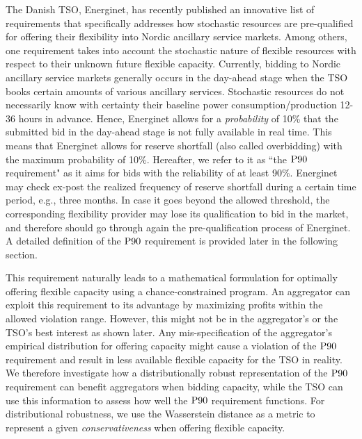 \documentclass[conference]{IEEEtran}
\begin{document}
The Danish \ac{TSO}, Energinet, has recently published an innovative list of requirements \cite{energinet} that specifically addresses how stochastic  resources are pre-qualified for offering their flexibility into Nordic ancillary service markets. Among others, one requirement takes into account the stochastic nature of  flexible resources with respect to their unknown future flexible capacity. Currently, bidding to Nordic ancillary service markets generally occurs in the day-ahead stage when the \ac{TSO} books certain amounts of various ancillary services. Stochastic resources do not necessarily know with certainty their baseline power consumption/production 12-36 hours in advance. Hence, Energinet allows for a \textit{probability} of 10\% that the submitted bid in the day-ahead stage is not fully available in real time. 
This means that Energinet allows for reserve shortfall (also called overbidding) with the maximum probability of 10\%. Hereafter, we refer to it as ``the $\rm{P90}$ requirement" as it aims for bids with the reliability of at least 90\%. Energinet may check ex-post the realized frequency of reserve shortfall during a certain time period, e.g., three months. In case it goes beyond the allowed threshold, the corresponding flexibility provider may lose its qualification to bid in the market, and therefore should go through again the pre-qualification process of Energinet. A detailed definition of the $\rm{P90}$ requirement is provided later in the following section. 

This requirement naturally leads to a mathematical formulation for optimally offering flexible capacity using a chance-constrained program. An aggregator can exploit this requirement to its advantage by maximizing profits within the allowed violation range. However, this might not be in the aggregator's or the \ac{TSO}'s best interest as shown later. Any mis-specification of the aggregator's empirical distribution for offering  capacity might cause a violation of the $\rm{P90}$ requirement and result in less available flexible capacity for the \ac{TSO} in reality. We therefore investigate how a distributionally robust representation of the $\rm{P90}$ requirement can benefit aggregators when bidding capacity, while the \ac{TSO} can use this information to assess how well the $\rm{P90}$ requirement functions. For distributional robustness, we use the Wasserstein distance as a metric to represent a given \textit{conservativeness} when offering flexible capacity.

\vspace{2mm}
\end{document}
